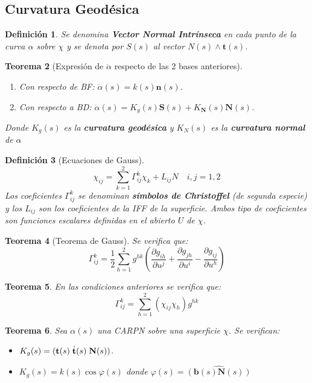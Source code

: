 \documentclass[twoside]{article}
\newtheorem{theorem}{Teorema}[section]
\newtheorem{defi}[theorem]{Definición}
\numberwithin{equation}{section}
\begin{document}
\subsection{Curvatura Geodésica}

\begin{defi}Se denomina \textbf{Vector Normal Intrínseca} en cada punto de la curva $\alpha$ sobre $\chi$ y se denota por $S(s)$ al vector $N(s)\wedge\textbf{t}(s)$.
\end{defi}

\begin{theorem}[Expresión de $\ddot{\alpha}$ respecto de las 2 bases anteriores]\
\begin{enumerate}
\item[A] Con respecto de BF: $\ddot{\alpha}(s)=k(s)\textbf{n}(s)$.
\item[B] Con respecto a BD: $\ddot{\alpha}(s)=K_g(s)\textbf{S}(s)+K_\textbf{N}(s)\textbf{N}(s)$. 
\end{enumerate}
Donde $K_g(s)$ es la \textbf{curvatura geodésica} y $K_N(s)$ es la \textbf{curvatura normal} de $\alpha$
\end{theorem}

\begin{defi}[Ecuaciones de Gauss] 
\begin{equation*}
\chi_{ij}=\sum_{k=1}^2\Gamma_{ij}^k\chi_k+L_{ij}N\quad i,j=1,2
\end{equation*}
Los coeficientes $\Gamma_{ij}^k$ se denominan \textbf{símbolos de Christoffel} (de segunda especie) y los $L_{ij}$ son los coeficientes de la IFF de la superficie. Ambos tipo de coeficientes son funciones escalares definidas en el abierto $U$ de $\chi$.
\end{defi}

\begin{theorem}[Teorema de Gauss]
Se verifica que:
\[
\Gamma_{ij}^k = \frac{1}{2}\sum_{h=1}^2 g^{hk}\left(\frac{\partial g_{ih}}{\partial u^j}+\frac{\partial g_{jh}}{\partial u^i}-\frac{\partial g_{ij}}{\partial u^h}\right)
\]
\end{theorem}
\begin{theorem}
En las condiciones anteriores se verifica que:
\[\Gamma^k_{ij} = \sum_{h=1}^2 (\chi_{ij} \chi_h ) g^{hk}\]
\end{theorem}


\begin{theorem}
Sea $\alpha(s)$ una CARPN sobre una superficie $\chi$. Se verifican:
\begin{itemize}
\item $K_g(s) = ({\bf t}(s)\; \dot{\bf t}(s) \; \textbf{N}(s) )$.
\item $K_g(s) = k(s)\cos{\varphi(s)}$ donde $\varphi(s)=\widehat{(\textbf{b}(s) \textbf{N}(s))}$
\end{itemize}
\end{theorem}
\end{document}
